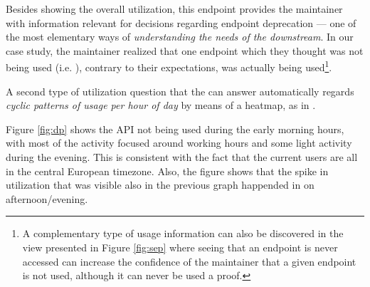 \documentclass[conference]{IEEEtran}
\begin{document}

Besides showing the overall utilization, this endpoint provides the maintainer with information relevant for decisions regarding endpoint deprecation --- one of the most elementary ways of {\em understanding the needs of the downstream}\cite{Haen14a}. In our case study, the maintainer realized that one endpoint which they thought was not being used (i.e. ), contrary to their expectations, was actually being used\footnote{A complementary type of usage information can also be discovered in the view presented in Figure \ref{fig:sep} where seeing that an endpoint is never accessed can increase the confidence of the maintainer that a given endpoint is not used, although it can never be used a proof.}.





\niceseparator


A second type of utilization question that the \tool can answer automatically regards {\em cyclic patterns of usage per hour of day} by means of a heatmap, as in . 




Figure \ref{fig:dp} shows the API not being used during the early morning hours, with most of the activity focused around working hours and some light activity during the evening. This is consistent with the fact that the current users are all in the central European timezone. Also, the figure shows that the spike in utilization that was visible also in the previous graph happended in on afternoon/evening.
\end{document}
